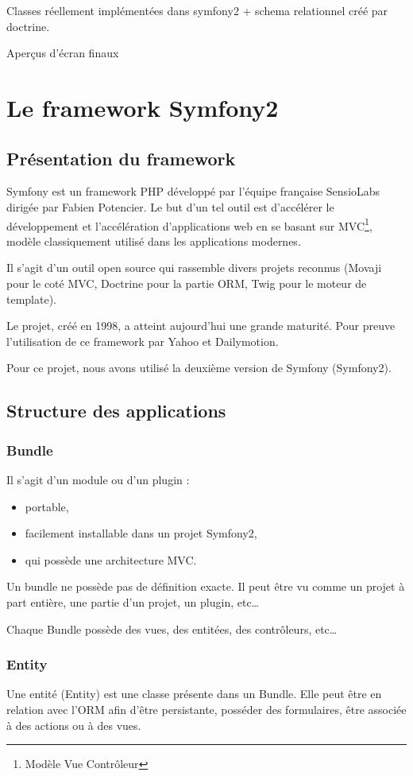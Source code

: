 Classes réellement implémentées dans symfony2 + schema relationnel créé par doctrine.

Aperçus d'écran finaux

\section{Le framework Symfony2}
\subsection{Présentation du framework}
Symfony est un framework PHP développé par l'équipe française SensioLabs dirigée par Fabien Potencier. Le but d'un tel outil est d’accélérer le développement et l'accélération d'applications web en se basant sur MVC\footnote{Modèle Vue Contrôleur}, modèle classiquement utilisé dans les applications modernes.

Il s'agit d'un outil open source qui rassemble divers projets reconnus (Movaji pour le coté MVC, Doctrine pour la partie ORM, Twig pour le moteur de template).

Le projet, créé en 1998, a atteint aujourd'hui une grande maturité. Pour preuve l'utilisation de ce framework par Yahoo et Dailymotion.

Pour ce projet, nous avons utilisé la deuxième version de Symfony (Symfony2).

\subsection{Structure des applications}

\subsubsection{Bundle}
Il s'agit d'un module ou d'un plugin :
\begin{itemize}
\item portable,
\item facilement installable dans un projet Symfony2,
\item qui possède une architecture MVC.
\end{itemize}

Un bundle ne possède pas de définition exacte. Il peut être vu comme un projet à part entière, une partie d'un projet, un plugin, etc\ldots

Chaque Bundle possède des vues, des entitées, des contrôleurs, etc\ldots

\subsubsection{Entity}
Une entité (Entity) est une classe présente dans un Bundle. Elle peut être en relation avec l'ORM afin d'être persistante, posséder des formulaires, être associée à des actions ou à des vues.

